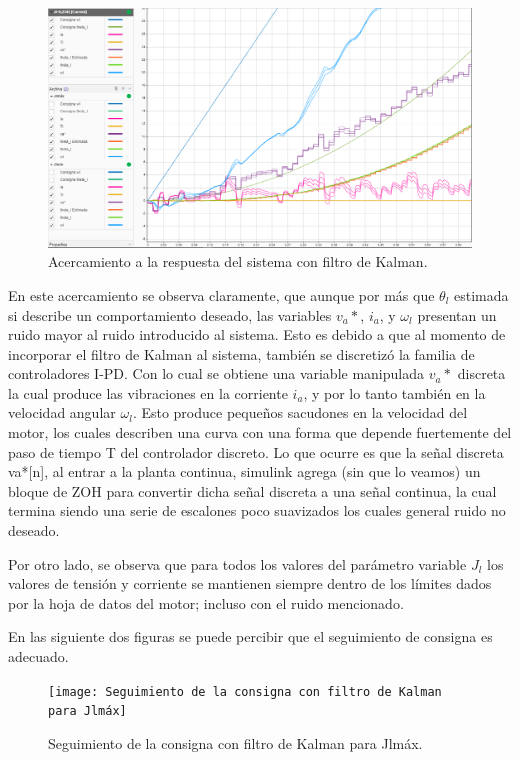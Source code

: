 \documentclass{article}
\begin{document}
\begin{sloppypar}
\begin{figure}[H]
    \centering
    \includegraphics[width=1\textwidth]{Acercamiento a la respuesta del sistema con filtro de Kalman}
    \caption{Acercamiento a la respuesta del sistema con filtro de Kalman.}
    \label{fig:Acercamiento a la respuesta del sistema con filtro de Kalman}
\end{figure}

En este acercamiento se observa claramente, que aunque por más que $\theta_l$ estimada si describe un comportamiento deseado, las variables $v_a*$, $i_a$, y $\omega_l$ presentan un ruido mayor al ruido introducido al sistema. Esto es debido a que al momento de incorporar el filtro de Kalman al sistema, también se discretizó la familia de controladores I-PD. Con lo cual se obtiene una variable manipulada $v_a*$ discreta la cual produce las vibraciones en la corriente $i_a$, y por lo tanto también en la velocidad angular $\omega_l$. Esto produce pequeños sacudones en la velocidad del motor, los cuales describen una curva con una forma que depende fuertemente del paso de tiempo T del controlador discreto. Lo que ocurre es que la señal discreta va*[n], al entrar a la planta continua, simulink agrega (sin que lo veamos) un bloque de ZOH para convertir dicha señal discreta a una señal continua, la cual termina siendo una serie de escalones poco suavizados los cuales general ruido no deseado.

Por otro lado, se observa que para todos los valores del parámetro variable $J_l$ los valores de tensión y corriente se mantienen siempre dentro de los límites dados por la hoja de datos del motor; incluso con el ruido mencionado.

En las siguiente dos figuras se puede percibir que el seguimiento de consigna es adecuado.

\begin{figure}[H]
    \centering
    \texttt{[image: Seguimiento de la consigna con filtro de Kalman para Jlmáx]}
    \caption{Seguimiento de la consigna con filtro de Kalman para Jlmáx.}
    \label{fig:Seguimiento de la consigna con filtro de Kalman para Jlmáx}
\end{figure}


\end{sloppypar}
\end{document}
